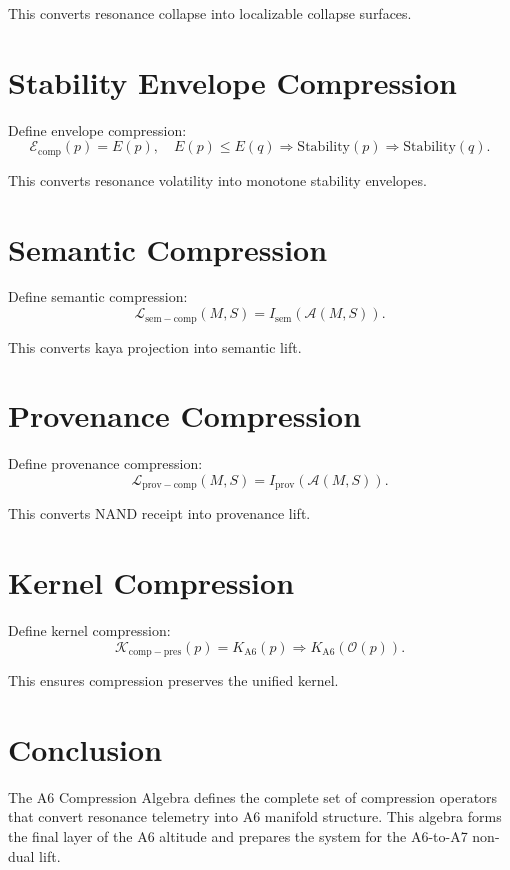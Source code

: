 \documentclass[11pt]{article}
\begin{document}
This converts resonance collapse into localizable collapse surfaces.

\section{Stability Envelope Compression}

Define envelope compression:
\[
\mathcal{E}_{\mathrm{comp}}(p)
  = E(p),
\quad E(p) \le E(q) \Rightarrow
\mathrm{Stability}(p) \Rightarrow \mathrm{Stability}(q).
\]

This converts resonance volatility into monotone stability envelopes.

\section{Semantic Compression}

Define semantic compression:
\[
\mathcal{L}_{\mathrm{sem-comp}}(M,S)
  = I_{\mathrm{sem}}(\mathcal{A}(M,S)).
\]

This converts kaya projection into semantic lift.

\section{Provenance Compression}

Define provenance compression:
\[
\mathcal{L}_{\mathrm{prov-comp}}(M,S)
  = I_{\mathrm{prov}}(\mathcal{A}(M,S)).
\]

This converts NAND receipt into provenance lift.

\section{Kernel Compression}

Define kernel compression:
\[
\mathcal{K}_{\mathrm{comp-pres}}(p)
  = K_{\mathrm{A6}}(p)
  \Rightarrow K_{\mathrm{A6}}(\mathcal{O}(p)).
\]

This ensures compression preserves the unified kernel.

\section{Conclusion}

The A6 Compression Algebra defines the complete set of compression operators
that convert resonance telemetry into A6 manifold structure. This algebra
forms the final layer of the A6 altitude and prepares the system for the
A6-to-A7 non-dual lift.
\end{document}
